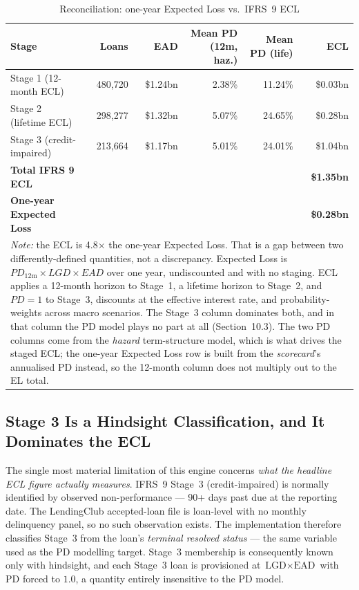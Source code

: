 \documentclass[11pt,a4paper]{article}
\begin{document}
\begin{table}[H]
\centering
\small
\caption{Reconciliation: one-year Expected Loss vs.\ IFRS~9 ECL}
\label{tab:el_ecl_reconciliation}
\vspace{0.5em}
\begin{tabular}{lrrrrr}
\toprule
\textbf{Stage} & \textbf{Loans} & \textbf{EAD} & \textbf{Mean PD (12m, haz.)} & \textbf{Mean PD (life)} & \textbf{ECL} \\
\midrule
Stage 1 (12-month ECL) & 480,720 & \$1.24bn & 2.38\% & 11.24\% & \$0.03bn \\
Stage 2 (lifetime ECL) & 298,277 & \$1.32bn & 5.07\% & 24.65\% & \$0.28bn \\
Stage 3 (credit-impaired) & 213,664 & \$1.17bn & 5.01\% & 24.01\% & \$1.04bn \\
\midrule
\textbf{Total IFRS 9 ECL} & & & & & \textbf{\$1.35bn} \\
\textbf{One-year Expected Loss} & & & & & \textbf{\$0.28bn} \\
\bottomrule
\multicolumn{6}{p{0.92\linewidth}}{\footnotesize \textit{Note:} the ECL is 4.8$\times$ the one-year Expected Loss. That is a gap between two differently-defined quantities, not a discrepancy. Expected Loss is $PD_{\text{12m}} \times LGD \times EAD$ over one year, undiscounted and with no staging. ECL applies a 12-month horizon to Stage~1, a lifetime horizon to Stage~2, and $PD = 1$ to Stage~3, discounts at the effective interest rate, and probability-weights across macro scenarios. The Stage~3 column dominates both, and in that column the PD model plays no part at all (Section~10.3). The two PD columns come from the \emph{hazard} term-structure model, which is what drives the staged ECL; the one-year Expected Loss row is built from the \emph{scorecard}'s annualised PD instead, so the 12-month column does not multiply out to the EL total.} \\
\end{tabular}
\end{table}

\subsection{Stage 3 Is a Hindsight Classification, and It Dominates the ECL}
The single most material limitation of this engine concerns \emph{what the headline ECL figure actually measures}. IFRS~9 Stage~3 (credit-impaired) is normally identified by observed non-performance --- 90+ days past due at the reporting date. The LendingClub accepted-loan file is loan-level with no monthly delinquency panel, so no such observation exists. The implementation therefore classifies Stage~3 from the loan's \emph{terminal resolved status} --- the same variable used as the PD modelling target. Stage~3 membership is consequently known only with hindsight, and each Stage~3 loan is provisioned at $\text{LGD}\times\text{EAD}$ with PD forced to $1.0$, a quantity entirely insensitive to the PD model.
\end{document}
